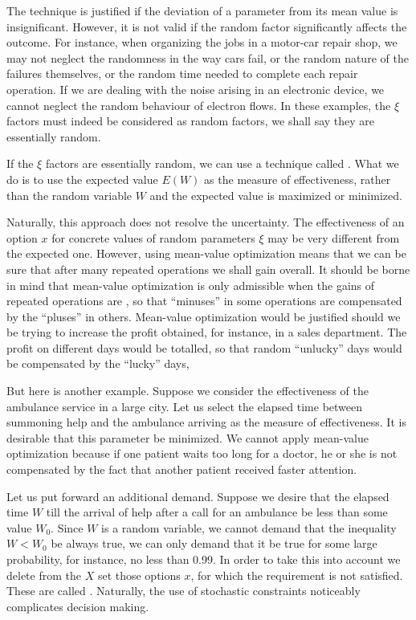 The technique is justified if the deviation of a parameter from its
mean value is insignificant. However, it is not valid if the random factor
significantly affects the outcome. For instance, when organizing the jobs
in a motor-car repair shop, we may not neglect the randomness in the
way cars fail, or the random nature of the failures themselves, or the
random time needed to complete each repair operation. If we are
dealing with the noise arising in an electronic device, we cannot neglect
the random behaviour of electron flows. In these examples, the $\xi$ factors
must indeed be considered as random factors, we shall say they are
essentially random.

 If the $\xi$ factors are essentially
random, we can use a technique called . What we do is to use the expected value $E (W)$ as the
measure of effectiveness, rather than the random variable $W$ and the
expected value is maximized or minimized.

Naturally, this approach does not resolve the uncertainty. The
effectiveness of an option $x$ for concrete values of random
parameters $\xi$ may be very different from the expected one. However,
using mean-value optimization means that we can be sure that after
many repeated operations we shall gain overall. It should be borne in
mind that mean-value optimization is only admissible when the gains of
repeated operations are , so that ``minuses'' in some
operations are compensated by the ``pluses'' in others. Mean-value
optimization would be justified should we be trying to increase the
proﬁt obtained, for instance, in a sales department. The proﬁt on
different days would be totalled, so that random ``unlucky'' days
would be compensated by the ``lucky'' days,

But here is another example. Suppose we consider the effectiveness of
the ambulance service in a large city. Let us select the elapsed time
between summoning help and the ambulance arriving as the measure of
effectiveness. It is desirable that this parameter be minimized. We cannot
apply mean-value optimization because if one patient waits too long for
a doctor, he or she is not compensated by the fact that another patient
received faster attention.

 Let us put forward an additional
demand.  Suppose we desire that the elapsed time $W$ till the arrival
of help after a call for an ambulance be less than some value
$W_{0}$. Since $W$ is a random variable, we cannot demand that the
inequality $W< W_{0}$ be always true, we can only demand that it be
true for some large probability, for instance, no less than 0.99. In
order to take this into account we delete from the $X$ set those
options $x$, for which the requirement is not satisfied. These
 are called .  Naturally, the use
of stochastic constraints noticeably complicates decision making.


